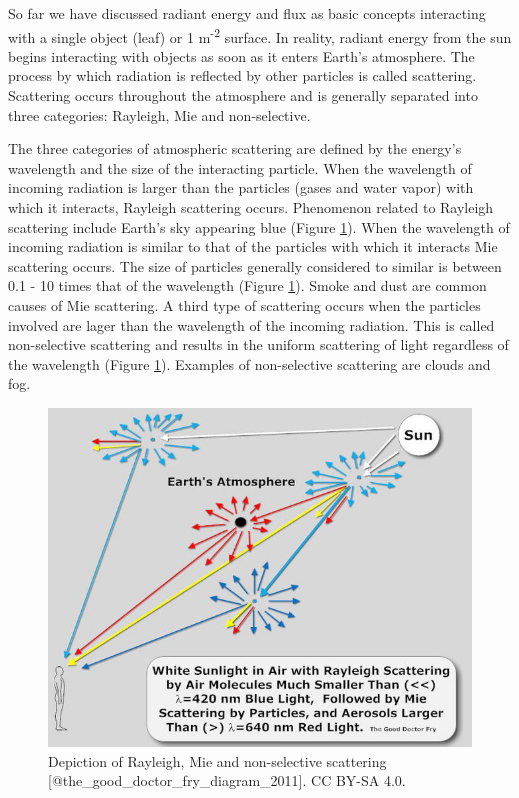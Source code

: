 \documentclass[
]{book}
\begin{document}
So far we have discussed radiant energy and flux as basic concepts
interacting with a single object (leaf) or 1 m\textsuperscript{-2} surface. In reality,
radiant energy from the sun begins interacting with objects as soon
as it enters Earth's atmosphere. The process by which radiation is
reflected by other particles is called scattering. Scattering occurs
throughout the atmosphere and is generally separated into three
categories: Rayleigh, Mie and non-selective.

The three categories of atmospheric scattering are defined by the
energy's wavelength and the size of the interacting particle. When
the wavelength of incoming radiation is larger than the particles
(gases and water vapor) with which it interacts, Rayleigh scattering
occurs. Phenomenon related to Rayleigh scattering include Earth's sky
appearing blue (Figure \ref{fig:11-scattering}). When the wavelength of
incoming radiation is similar to that of the particles with which it
interacts Mie scattering occurs. The size of particles generally
considered to similar is between 0.1 - 10 times that of the wavelength
(Figure \ref{fig:11-scattering}). Smoke and dust are common causes of
Mie scattering. A third type of scattering occurs when the particles
involved are lager than the wavelength of the incoming radiation.
This is called non-selective scattering and results in the uniform
scattering of light regardless of the wavelength (Figure
\ref{fig:11-scattering}). Examples of non-selective scattering are
clouds and fog.

\begin{figure}
\includegraphics[width=8.89in]{images/11-scattering} \caption{Depiction of Rayleigh, Mie and non-selective scattering [@the_good_doctor_fry_diagram_2011]. CC BY-SA 4.0.}\label{fig:11-scattering}
\end{figure}
\end{document}
